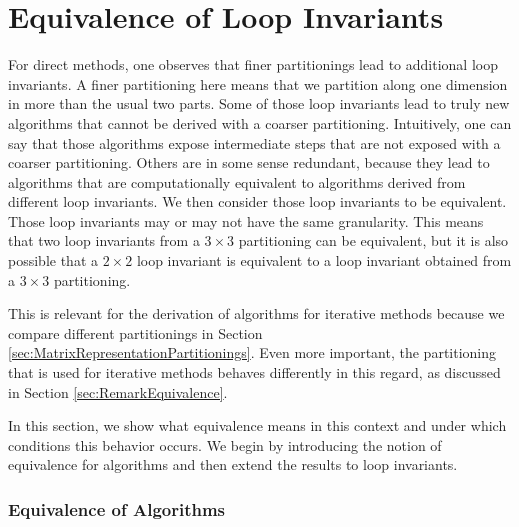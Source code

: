 \section{Equivalence of Loop Invariants}
\label{sec:equivalence}

For direct methods, one observes that finer partitionings lead to additional loop invariants. A finer partitioning here means that we partition along one dimension in more than the usual two parts. Some of those loop invariants lead to truly new algorithms that cannot be derived with a coarser partitioning. Intuitively, one can say that those algorithms expose intermediate steps that are not exposed with a coarser partitioning. Others are in some sense redundant, because they lead to algorithms that are computationally equivalent to algorithms derived from different loop invariants. We then consider those loop invariants to be equivalent. Those loop invariants may or may not have the same granularity. This means that two loop invariants from a $3 \times 3$ partitioning can be equivalent, but it is also possible that a $2 \times 2$ loop invariant is equivalent to a loop invariant obtained from a $3 \times 3$ partitioning.

This is relevant for the derivation of algorithms for iterative methods because we compare different partitionings in Section \ref{sec:MatrixRepresentationPartitionings}. Even more important, the partitioning that is used for iterative methods behaves differently in this regard, as discussed in Section \ref{sec:RemarkEquivalence}.

In this section, we show what equivalence means in this context and under which conditions this behavior occurs. We begin by introducing the notion of equivalence for algorithms and then extend the results to loop invariants.

\subsubsection{Equivalence of Algorithms}

